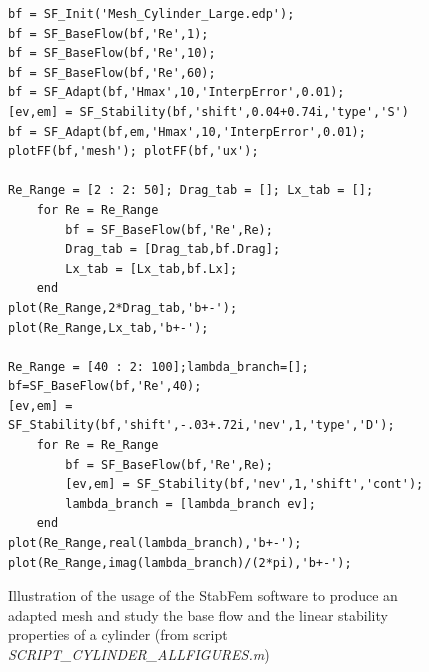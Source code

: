 \documentclass[twocolumn,10pt]{asme2ej}
\begin{document}
\begin{figure}[t]
\small
\begin{lstlisting}
bf = SF_Init('Mesh_Cylinder_Large.edp');
bf = SF_BaseFlow(bf,'Re',1);
bf = SF_BaseFlow(bf,'Re',10);
bf = SF_BaseFlow(bf,'Re',60);
bf = SF_Adapt(bf,'Hmax',10,'InterpError',0.01);
[ev,em] = SF_Stability(bf,'shift',0.04+0.74i,'type','S')
bf = SF_Adapt(bf,em,'Hmax',10,'InterpError',0.01);
plotFF(bf,'mesh'); plotFF(bf,'ux');

Re_Range = [2 : 2: 50]; Drag_tab = []; Lx_tab = [];
    for Re = Re_Range
        bf = SF_BaseFlow(bf,'Re',Re);
        Drag_tab = [Drag_tab,bf.Drag];
        Lx_tab = [Lx_tab,bf.Lx];
    end
plot(Re_Range,2*Drag_tab,'b+-');
plot(Re_Range,Lx_tab,'b+-');

Re_Range = [40 : 2: 100];lambda_branch=[];
bf=SF_BaseFlow(bf,'Re',40);
[ev,em] = SF_Stability(bf,'shift',-.03+.72i,'nev',1,'type','D');
    for Re = Re_Range
        bf = SF_BaseFlow(bf,'Re',Re);
        [ev,em] = SF_Stability(bf,'nev',1,'shift','cont');
        lambda_branch = [lambda_branch ev];
    end
plot(Re_Range,real(lambda_branch),'b+-');
plot(Re_Range,imag(lambda_branch)/(2*pi),'b+-');
\end{lstlisting}
\normalsize
\caption{Illustration of the usage of the StabFem software to produce an adapted mesh and study the base flow and the linear stability properties of a cylinder
(from script {\em SCRIPT\_CYLINDER\_ALLFIGURES.m})}
\label{Listing2}
\end{figure}
\end{document}
